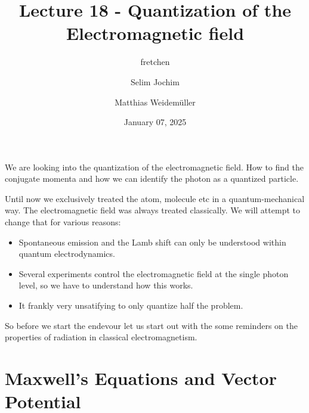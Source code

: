 \documentclass[10pt]{article}
\renewenvironment{abstract}
  {{\bfseries\noindent{\abstractname}\par\nobreak}\footnotesize}
  {\bigskip}
\begin{document}
\title{Lecture 18 - Quantization of the Electromagnetic field}



\author[1]{fretchen}%
\author[2]{Selim Jochim}%
\author[2]{Matthias Weidemüller}%
%
%


\vspace{-1em}



  
  \date{January 07, 2025}


\begingroup
\let\center\flushleft
\let\endcenter\endflushleft
\maketitle
\endgroup





\begin{abstract}
We are looking into the quantization of the electromagnetic field. How to find the conjugate momenta and how we can identify the photon as a quantized particle.%
\end{abstract}%



\sloppy


Until now we exclusively treated the atom, molecule etc in a quantum-mechanical way. The electromagnetic field was always treated classically. We will attempt to change that for various reasons:
\begin{itemize}
\item Spontaneous emission and the Lamb shift can only be understood within quantum electrodynamics.
\item Several experiments control the electromagnetic field at the single photon level, so we have to understand how this works.
\item It frankly very unsatifying to only quantize half the problem.
\end{itemize}

So before we start the endevour let us start out with the some reminders on the properties of radiation in classical electromagnetism.

\section{Maxwell's Equations and Vector Potential}
\end{document}
